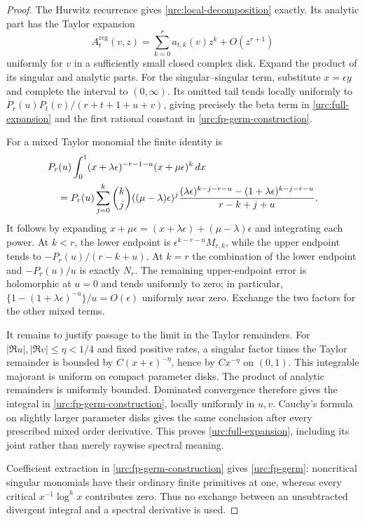 \begin{proof}
The Hurwitz recurrence gives \eqref{urc:local-decomposition} exactly.
Its analytic part has the Taylor expansion
\[
 A_t^{\mathrm{reg}}(v,z)=\sum_{k=0}^r a_{t,k}(v)z^k
                              +O(z^{r+1})
\]
uniformly for $v$ in a sufficiently small closed complex disk.
Expand the product of its singular and analytic parts. For the
singular--singular term, substitute $x=\epsilon y$ and complete
the interval to $(0,\infty)$. Its omitted tail tends locally
uniformly to $P_r(u)P_t(v)/(r+t+1+u+v)$, giving precisely the
beta term in \eqref{urc:full-expansion} and the first rational
constant in \eqref{urc:fp-germ-construction}.

For a mixed Taylor monomial the finite identity is
\begin{align}
 &P_r(u)\int_0^1
       (x+\lambda\epsilon)^{-r-1-u}(x+\mu\epsilon)^k\,dx
 \notag\\
 &\quad=P_r(u)\sum_{j=0}^k\binom kj
       ((\mu-\lambda)\epsilon)^j
 \frac{(\lambda\epsilon)^{k-j-r-u}
                  -(1+\lambda\epsilon)^{k-j-r-u}}
      {r-k+j+u}.
 \label{urc:exact-mixed-primitive}
\end{align}
It follows by expanding $x+\mu\epsilon=(x+\lambda\epsilon)
+(\mu-\lambda)\epsilon$ and integrating each power. At $k<r$,
the lower endpoint is $\epsilon^{k-r-u}M_{r,k}$, while the upper
endpoint tends to $-P_r(u)/(r-k+u)$. At $k=r$ the combination of
the lower endpoint and $-P_r(u)/u$ is exactly $N_r$.
The remaining upper-endpoint error is holomorphic at $u=0$ and
tends uniformly to zero; in particular,
$\{1-(1+\lambda\epsilon)^{-u}\}/u=O(\epsilon)$ uniformly near
zero. Exchange the two factors for the other mixed terms.

It remains to justify passage to the limit in the Taylor remainders.
For $|\Re u|,|\Re v|\le\eta<1/4$ and fixed positive rates, a
singular factor times the Taylor remainder is bounded by
$C(x+\epsilon)^{-\eta}$, hence by $Cx^{-\eta}$ on $(0,1)$.
This integrable majorant is uniform on compact parameter disks.
The product of analytic remainders is uniformly bounded. Dominated
convergence therefore gives the integral in
\eqref{urc:fp-germ-construction}, locally uniformly in $u,v$.
Cauchy's formula on slightly larger parameter disks gives the
same conclusion after every prescribed mixed order derivative.
This proves \eqref{urc:full-expansion}, including its joint rather
than merely raywise spectral meaning.

Coefficient extraction in \eqref{urc:fp-germ-construction} gives
\eqref{urc:fp-germ}: noncritical singular monomials have their
ordinary finite primitives at one, whereas every critical
$x^{-1}\log^h x$ contributes zero. Thus no exchange between an
unsubtracted divergent integral and a spectral derivative is used.
\end{proof}

